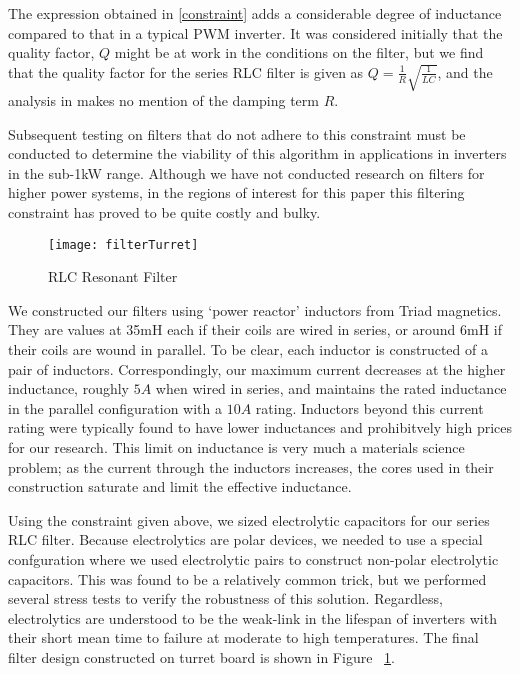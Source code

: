 The expression obtained in \ref{constraint} adds a considerable degree of inductance compared to that in a typical PWM inverter. It was considered initially that the quality factor, $Q$ might be at work in the conditions on the filter, but we find that the quality factor for the series RLC filter is given as $Q = \frac{1}{R}\sqrt{\frac{1}{LC}}$, and the analysis in \cite{ricardo} makes no mention of the damping term $R$. 

Subsequent testing on filters that do not adhere to this constraint must be conducted to determine the viability of this algorithm in applications in inverters in the sub-1kW range. Although we have not conducted research on filters for higher power systems, in the regions of interest for this paper this filtering constraint has proved to be quite costly and bulky. 

\begin{figure}[h]
\centering
\texttt{[image: filterTurret]}
\caption{RLC Resonant Filter}
\label{filterTurret}
\end{figure}

We constructed our filters using `power reactor' inductors from Triad magnetics. They are values at 35mH each if their coils are wired in series, or around 6mH if their coils are wound in parallel. To be clear, each inductor is constructed of a pair of inductors. Correspondingly, our maximum current decreases at the higher inductance, roughly $5A$ when wired in series, and maintains the rated inductance in the parallel configuration with a $10A$ rating. Inductors beyond this current rating were typically found to have lower inductances and prohibitvely high prices for our research. This limit on inductance is very much a materials science problem; as the current through the inductors increases, the cores used in their construction saturate and limit the effective inductance. 

Using the constraint given above, we sized electrolytic capacitors for our series RLC filter. Because electrolytics are polar devices, we needed to use a special confguration where we used electrolytic pairs to construct non-polar electrolytic capacitors. This was found to be a relatively common trick, but we performed several stress tests to verify the robustness of this solution. Regardless, electrolytics are understood to be the weak-link in the lifespan of inverters with their short mean time to failure at moderate to high temperatures. The final filter design constructed on turret board is shown in Figure ~\ref{filterTurret}.  



